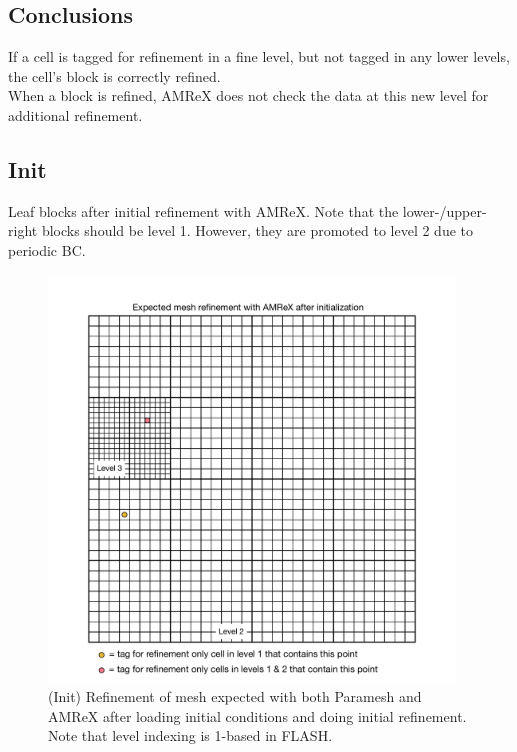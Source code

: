 \documentclass[12pt,letterpaper]{article}
\begin{document}
\subsection{Conclusions}
If a cell is tagged for refinement in a fine level, but not tagged in any lower
levels, the cell's block is correctly refined.\\

When a block is refined, AMReX does not check the data at this new level for
additional refinement.

\newpage
\subsection{Init}
Leaf blocks after initial refinement with AMReX.  Note that the
lower-/upper-right blocks should be level 1.  However, they are promoted to
level 2 due to periodic BC.
\begin{figure}[!hp]
\begin{center}
\includegraphics[width=4.25in]{TestRefine_Init_AMReX.pdf}
\caption{(Init) Refinement of mesh expected with both Paramesh and AMReX after loading
initial conditions and doing initial refinement.  Note that level indexing is
1-based in FLASH.}
\end{center}
\end{figure}

\newpage
\end{document}

